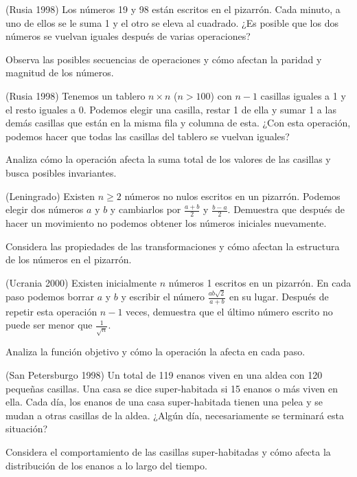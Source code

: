 \documentclass[11pt]{scrartcl}
\begin{document}
\begin{problem}
(Rusia 1998) Los números 19 y 98 están escritos en el pizarrón. Cada minuto, a uno de ellos se le suma 1 y el otro se eleva al cuadrado. ¿Es posible que los dos números se vuelvan iguales después de varias operaciones?
\begin{hint}
Observa las posibles secuencias de operaciones y cómo afectan la paridad y magnitud de los números.
\end{hint}
\end{problem}

\begin{problem}
(Rusia 1998) Tenemos un tablero \( n \times n \) (\( n > 100 \)) con \( n - 1 \) casillas iguales a 1 y el resto iguales a 0. Podemos elegir una casilla, restar 1 de ella y sumar 1 a las demás casillas que están en la misma fila y columna de esta. ¿Con esta operación, podemos hacer que todas las casillas del tablero se vuelvan iguales?
\begin{hint}
Analiza cómo la operación afecta la suma total de los valores de las casillas y busca posibles invariantes.
\end{hint}
\end{problem}

\begin{problem}
(Leningrado) Existen \( n \geq 2 \) números no nulos escritos en un pizarrón. Podemos elegir dos números \( a \) y \( b \) y cambiarlos por \( \frac{a+b}{2} \) y \( \frac{b-a}{2} \). Demuestra que después de hacer un movimiento no podemos obtener los números iniciales nuevamente.
\begin{hint}
Considera las propiedades de las transformaciones y cómo afectan la estructura de los números en el pizarrón.
\end{hint}
\end{problem}

\begin{problem}
(Ucrania 2000) Existen inicialmente \( n \) números 1 escritos en un pizarrón. En cada paso podemos borrar \( a \) y \( b \) y escribir el número \( \frac{ab\sqrt{2}}{a + b} \) en su lugar. Después de repetir esta operación \( n - 1 \) veces, demuestra que el último número escrito no puede ser menor que \( \frac{1}{\sqrt{n}} \).
\begin{hint}
Analiza la función objetivo y cómo la operación la afecta en cada paso.
\end{hint}
\end{problem}

\begin{problem}
(San Petersburgo 1998) Un total de 119 enanos viven en una aldea con 120 pequeñas casillas. Una casa se dice super-habitada si 15 enanos o más viven en ella. Cada día, los enanos de una casa super-habitada tienen una pelea y se mudan a otras casillas de la aldea. ¿Algún día, necesariamente se terminará esta situación?
\begin{hint}
Considera el comportamiento de las casillas super-habitadas y cómo afecta la distribución de los enanos a lo largo del tiempo.
\end{hint}
\end{problem}
\end{document}
